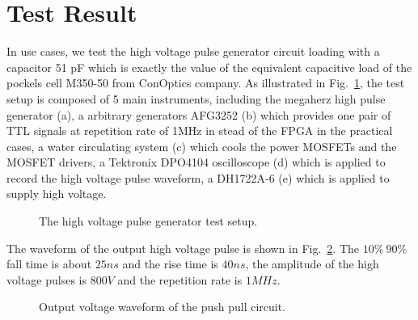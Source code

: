 \documentclass[aip,rsi,reprint,graphicx]{revtex4-1} %
\begin{document}
\section{Test Result}
In use cases, we test the high voltage pulse generator circuit loading with a capacitor 51 pF which is exactly the value of the equivalent capacitive load of the pockels cell M350-50 from ConOptics company.  As illustrated in Fig.~\ref{FIG3}, the test setup is composed of 5 main instruments, including the megaherz high pulse generator (a), a arbitrary generators AFG3252 (b) which provides one pair of  TTL signals at repetition rate of 1MHz in stead of the FPGA in the practical cases, a water circulating system (c) which cools the power MOSFETs and the MOSFET drivers,  
a Tektronix DPO4104 oscilloscope (d) which is applied to record the high voltage pulse waveform, a DH1722A-6 (e) which is applied to supply high voltage.
\begin{figure}[hbt]
\caption{The high voltage pulse generator test setup. \label{FIG3}}%
\end{figure}
The waveform of the output high voltage pulse is shown in Fig.~\ref{Fig4}. The $10\%~90\%$ fall time is about $25ns$ and the rise time is $40 ns$, the amplitude of the high voltage pulses is $800V$ and the repetition rate is $1MHz$.
\begin{figure}[hbt]
\caption{Output voltage waveform of the push pull circuit.\label{Fig4}}%
\end{figure}

\end{document}
